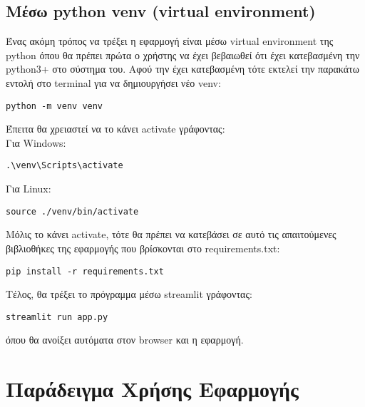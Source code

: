 \documentclass[a4paper,12pt]{article}
\begin{document}
\subsection{Mέσω python venv (virtual environment)}
Ένας ακόμη τρόπος να τρέξει η εφαρμογή είναι μέσω virtual environment της python όπου θα πρέπει πρώτα ο χρήστης να έχει βεβαιωθεί ότι έχει κατεβασμένη την python3+ στο σύστημα του.
Αφού την έχει κατεβασμένη τότε εκτελεί την παρακάτω εντολή στο terminal για να δημιουργήσει νέο venv:
\begin{lstlisting}
python -m venv venv
\end{lstlisting}
Έπειτα θα χρειαστεί να το κάνει activate γράφοντας:\\
Για Windows:
\begin{lstlisting}
.\venv\Scripts\activate
\end{lstlisting}
Για Linux:
\begin{lstlisting}
source ./venv/bin/activate
\end{lstlisting}
Μόλις το κάνει activate, τότε θα πρέπει να κατεβάσει σε αυτό τις απαιτούμενες βιβλιοθήκες της εφαρμογής που βρίσκονται στο requirements.txt:
\begin{lstlisting}
pip install -r requirements.txt
\end{lstlisting}
Τέλος, θα τρέξει το πρόγραμμα μέσω streamlit γράφοντας:
\begin{lstlisting}
streamlit run app.py 
\end{lstlisting}
όπου θα ανοίξει αυτόματα στον browser και η εφαρμογή.

\newpage

\section{Παράδειγμα Χρήσης Εφαρμογής}
\end{document}
